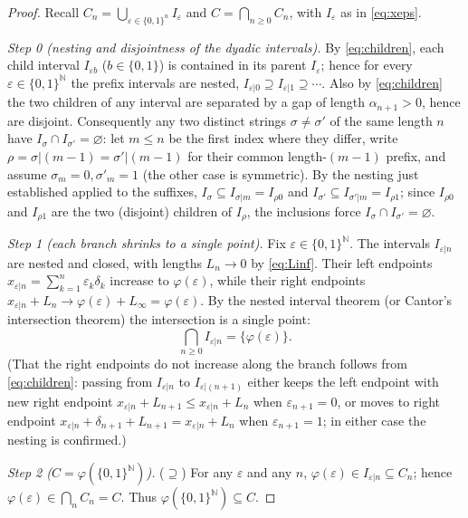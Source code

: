 \documentclass{amsart}
\theoremstyle{definition}
\theoremstyle{remark}
\begin{document}
\begin{proof}
Recall $C_n=\bigcup_{\varepsilon\in\{0,1\}^n}I_\varepsilon$ and
$C=\bigcap_{n\ge0}C_n$, with $I_\varepsilon$ as in \eqref{eq:xeps}.

\smallskip
\emph{Step 0 (nesting and disjointness of the dyadic intervals).}
By \eqref{eq:children}, each child interval $I_{\varepsilon b}$ ($b\in\{0,1\}$) is
contained in its parent $I_\varepsilon$; hence for every
$\varepsilon\in\{0,1\}^{\mathbb N}$ the prefix intervals are nested,
$I_{\varepsilon|0}\supseteq I_{\varepsilon|1}\supseteq\cdots$. Also by
\eqref{eq:children} the two children of any interval are separated by a gap of
length $\alpha_{n+1}>0$, hence are disjoint. Consequently any two distinct strings
$\sigma\ne\sigma'$ of the same length $n$ have $I_\sigma\cap I_{\sigma'}=\varnothing$:
let $m\le n$ be the first index where they differ, write $\rho=\sigma|(m-1)=\sigma'|(m-1)$
for their common length-$(m-1)$ prefix, and assume $\sigma_m=0,\sigma'_m=1$ (the
other case is symmetric). By the nesting just established applied to the suffixes,
$I_\sigma\subseteq I_{\sigma|m}=I_{\rho 0}$ and $I_{\sigma'}\subseteq
I_{\sigma'|m}=I_{\rho 1}$; since $I_{\rho 0}$ and $I_{\rho 1}$ are the two
(disjoint) children of $I_\rho$, the inclusions force $I_\sigma\cap
I_{\sigma'}=\varnothing$.

\smallskip
\emph{Step 1 (each branch shrinks to a single point).}
Fix $\varepsilon\in\{0,1\}^{\mathbb N}$. The intervals $I_{\varepsilon|n}$ are
nested and closed, with lengths $L_n\to0$ by \eqref{eq:Linf}. Their left endpoints
$x_{\varepsilon|n}=\sum_{k=1}^{n}\varepsilon_k\delta_k$ increase to
$\varphi(\varepsilon)$, while their right endpoints
$x_{\varepsilon|n}+L_n\to\varphi(\varepsilon)+L_\infty=\varphi(\varepsilon)$. By the
nested interval theorem (or Cantor's intersection theorem) the intersection is a
single point:
\begin{equation}\label{eq:cell}
\bigcap_{n\ge0}I_{\varepsilon|n}=\{\varphi(\varepsilon)\}.
\end{equation}
(That the right endpoints do not increase along the branch follows from
\eqref{eq:children}: passing from $I_{\varepsilon|n}$ to $I_{\varepsilon|(n+1)}$
either keeps the left endpoint with new right endpoint $x_{\varepsilon|n}+L_{n+1}\le
x_{\varepsilon|n}+L_n$ when $\varepsilon_{n+1}=0$, or moves to right endpoint
$x_{\varepsilon|n}+\delta_{n+1}+L_{n+1}=x_{\varepsilon|n}+L_n$ when
$\varepsilon_{n+1}=1$; in either case the nesting is confirmed.)

\smallskip
\emph{Step 2 ($C=\varphi(\{0,1\}^{\mathbb N})$).}
($\supseteq$) For any $\varepsilon$ and any $n$,
$\varphi(\varepsilon)\in I_{\varepsilon|n}\subseteq C_n$; hence
$\varphi(\varepsilon)\in\bigcap_n C_n=C$. Thus
$\varphi(\{0,1\}^{\mathbb N})\subseteq C$.


\end{proof}
\end{document}
